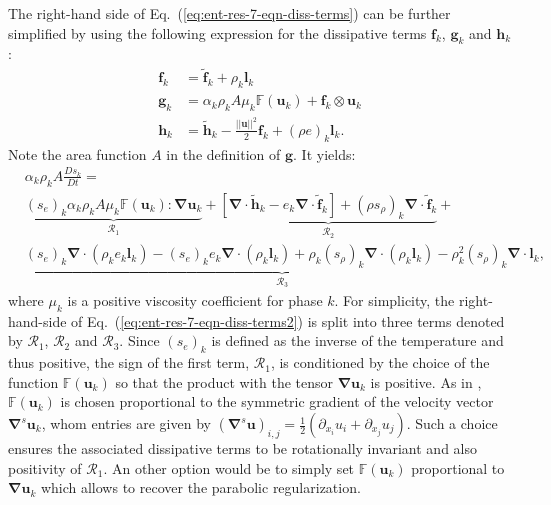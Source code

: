 \documentclass[preprint,10pt]{elsarticle}
\renewcommand{\div}{\mbold{\nabla}\! \cdot \!}
\newcommand{\grad}{\mbold{\nabla}}
\newcommand{\mbold}[1]{\boldsymbol#1}
\newcommand{\eqt}[1]{Eq.~(\ref{#1})}                     %
\begin{document}
The right-hand side of \eqt{eq:ent-res-7-eqn-diss-terms} can be further simplified by using the following expression
for the dissipative terms $\mbold f_k$,  $\mbold g_k$ and $\mbold h_k$:
\begin{align}\label{eq:def-diss-terms-sect4}
  \mbold f_k &= \tilde{\mbold f}_k + \rho_k \mbold  l_k 
  \\
  \mbold g_k &= \alpha_k \rho_k A \mu_k \mathbb{F}(\mbold u_k) + \mbold f_k \otimes \mbold u_k
  \\
  \mbold h_k &= \tilde{\mbold h}_k - \frac{|| \mbold u||^2 }{2} \mbold f_k + (\rho e)_k \mbold l_k.
\end{align}
Note the area function $A$ in the definition of $\mbold g$. It yields:
%
\begin{align}\label{eq:ent-res-7-eqn-diss-terms2}
&\alpha_k \rho_k A \frac{Ds_k}{Dt} = \nonumber \\
&\underbrace{\left(s_e\right)_k \alpha_k \rho_k A \mu_k \mathbb{F}(\mbold u_k) : \grad \mbold u_k}_{\mathcal{R}_1} +
\underbrace{\left[ \div \tilde{\mbold h}_k  - e_k \div \tilde{\mbold f}_k  \right] + (\rho s_\rho)_k \div \tilde{\mbold f}_k}_{\mathcal{R}_2} + \nonumber \\
&\underbrace{(s_e)_k \div \left( \rho_k e_k \mbold l_k \right) -  (s_e)_k e_k \div \left( \rho_k \mbold l_k \right) + \rho_k (s_\rho)_k \div \left( \rho_k \mbold l_k \right) 
  - \rho_k^2 (s_\rho)_k \div \mbold l_k}_{\mathcal{R}_3},
\end{align}
%
where $\mu_k$ is a positive viscosity coefficient for phase $k$. For simplicity, the right-hand-side of \eqt{eq:ent-res-7-eqn-diss-terms2} is split into three terms denoted by $\mathcal{R}_1$, $\mathcal{R}_2$ and $\mathcal{R}_3$. Since $(s_e)_k$ is defined as the inverse of the temperature and thus positive, the sign of the first term, $\mathcal{R}_1$, is conditioned by the choice of the function $\mathbb{F}(\mbold u_k)$ so that the product with the tensor $\grad \mbold u_k$ is positive. As in \cite{jlg}, $\mathbb{F}(\mbold u_k)$ is chosen proportional to the symmetric gradient of the velocity vector $\grad^s \mbold u_k$, whom entries are given by $(\grad^s \mbold u)_{i,j} = \frac{1}{2} \left( \partial_{x_i} u_i + \partial_{x_j} u_j \right)$. Such a choice ensures the associated dissipative terms to be rotationally invariant and also positivity of $\mathcal{R}_1$. An other option would be to simply set $\mathbb{F}(\mbold u_k)$ proportional to $\grad \mbold u_k$ which allows to recover the parabolic regularization. 
\end{document}
